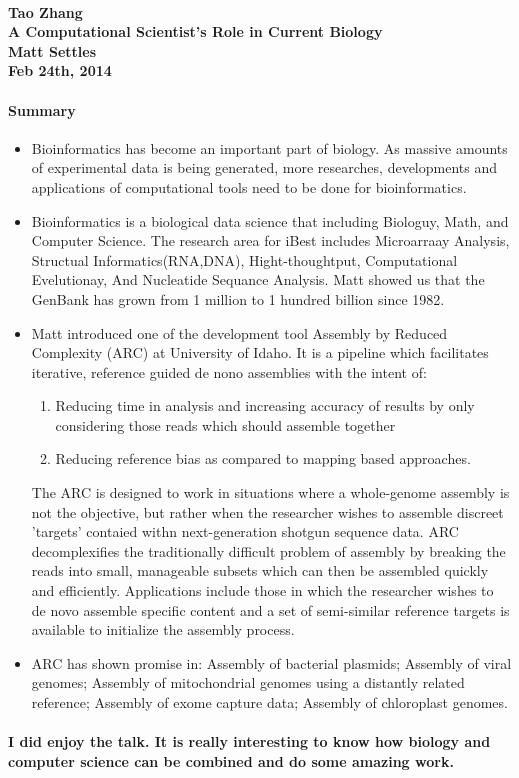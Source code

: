 \documentclass[12pt]{article}
\begin{document}
\paragraph{Tao Zhang\\A Computational Scientist's Role in Current Biology\\Matt Settles\\Feb 24th, 2014}
\paragraph{Summary}
\begin{itemize}
	\item Bioinformatics has become an important part of biology. As massive amounts of experimental data is being generated, more researches, developments and applications of computational tools need to be done for bioinformatics.
	\item Bioinformatics is a biological data science that including Biologuy, Math, and Computer Science. The research area for iBest includes Microarraay Analysis, Structual Informatics(RNA,DNA), Hight-thoughtput, Computational Evelutionay, And Nucleatide Sequance Analysis. Matt showed us that the GenBank has grown from 1 million to 1 hundred billion since 1982. 
	\item Matt introduced one of the development tool Assembly by Reduced Complexity (ARC) at University of Idaho. It is a pipeline which facilitates iterative, reference guided de nono assemblies with the intent of:
	\begin{enumerate}
		\item Reducing time in analysis and increasing accuracy of results by only considering those reads which should assemble together
		\item Reducing reference bias as compared to mapping based approaches.
	\end{enumerate}
	The ARC is designed to work in situations where a whole-genome assembly is not the objective, but rather when the researcher wishes to assemble discreet 'targets' contaied withn next-generation shotgun sequence data. ARC decomplexifies the traditionally difficult problem of assembly by breaking the reads into small, manageable subsets which can then be assembled quickly and efficiently. Applications include those in which the researcher wishes to de novo assemble specific content and a set of semi-similar reference targets is available to initialize the assembly process.
	\item ARC has shown promise in: Assembly of bacterial plasmids; Assembly of viral genomes; Assembly of mitochondrial genomes using a distantly related reference; Assembly of exome capture data; Assembly of chloroplast genomes.
\end{itemize}

\paragraph{I did enjoy the talk. It is really interesting to know how biology and computer science can be combined and do some amazing work.}
\end{document}
